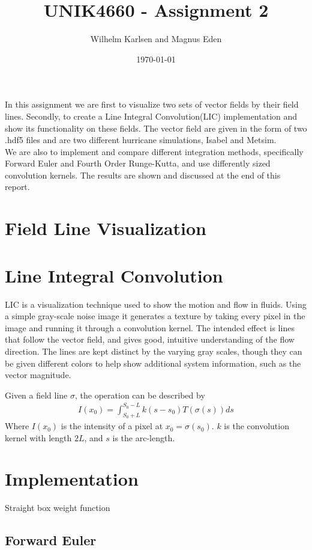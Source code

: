 \documentclass[11pt,a4paper,english]{article}
\title{UNIK4660 - Assignment 2}
\author{Wilhelm Karlsen and Magnus Eden}
\date{\today}
\numberwithin{equation}{section}
\begin{document}
\maketitle
In this assignment we are first to visualize two sets of vector fields by their field lines. Secondly, to create a Line Integral Convolution(LIC) implementation and show its functionality on these fields. The vector field are given in the form of two .hdf5 files and are two different hurricane simulations, Isabel and Metsim. 
\\
We are also to implement and compare different integration methods, specifically Forward Euler and Fourth Order Runge-Kutta, and use differently sized convolution kernels. The results are shown and discussed at the end of this report.

\section{Field Line Visualization}

\section{Line Integral Convolution}
LIC is a visualization technique used to show the motion and flow in fluids. Using a simple gray-scale noise image it generates a texture by taking every pixel in the image and running it through a convolution kernel. The intended effect is lines that follow the vector field, and gives good, intuitive understanding of the flow direction. The lines are kept distinct by the varying gray scales, though they can be given different colors to help show additional system information, such as the vector magnitude.

Given a field line $\sigma$, the operation can be described by
\begin{align*}
	I(x_0) = \int_{S_0+L}^{S_0-L}k(s - s_0)T(\sigma(s))ds
\end{align*}
Where $I(x_0)$ is the intensity of a pixel at $x_0 = \sigma(s_0)$. $k$ is the convolution kernel with length $2L$, and $s$ is the arc-length.

\section{Implementation}

Straight box weight function


\subsection{Forward Euler}
\end{document}
